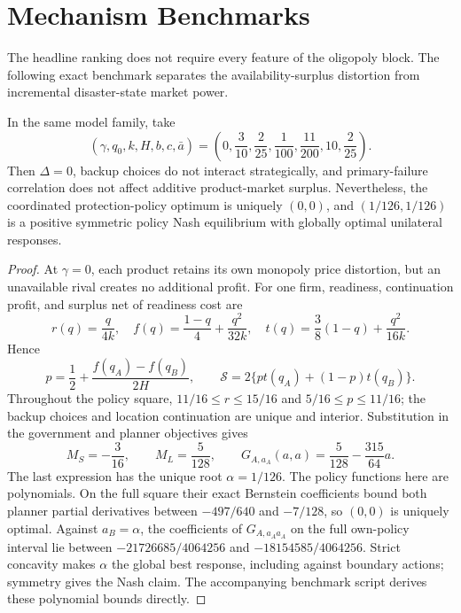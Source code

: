\section{Mechanism Benchmarks}\label{sec:benchmarks}

The headline ranking does not require every feature of the oligopoly block. The following exact benchmark separates the availability-surplus distortion from incremental disaster-state market power.

\begin{proposition}\label{prop:zero-delta}
In the same model family, take
\begin{equation}
(\gamma,q_0,k,H,b,c,\bar a)
=\left(0,\frac3{10},\frac2{25},\frac1{100},\frac{11}{200},10,\frac2{25}\right).
\label{eq:zero-delta-witness}
\end{equation}
Then $\Delta=0$, backup choices do not interact strategically, and primary-failure correlation does not affect additive product-market surplus. Nevertheless, the coordinated protection-policy optimum is uniquely $(0,0)$, and $(1/126,1/126)$ is a positive symmetric policy Nash equilibrium with globally optimal unilateral responses.
\end{proposition}

\begin{proof}
At $\gamma=0$, each product retains its own monopoly price distortion, but an unavailable rival creates no additional profit. For one firm, readiness, continuation profit, and surplus net of readiness cost are
\begin{equation}
r(q)=\frac{q}{4k},\quad
f(q)=\frac{1-q}{4}+\frac{q^2}{32k},\quad
t(q)=\frac38(1-q)+\frac{q^2}{16k}.
\end{equation}
Hence
\begin{equation}
p=\frac12+\frac{f(q_A)-f(q_B)}{2H},\qquad
\mathcal S=2\{pt(q_A)+(1-p)t(q_B)\}.
\end{equation}
Throughout the policy square, $11/16\leq r\leq15/16$ and $5/16\leq p\leq11/16$; the backup choices and location continuation are unique and interior. Substitution in the government and planner objectives gives
\begin{equation}
M_S=-\frac3{16},\qquad M_L=\frac5{128},\qquad
G_{A,a_A}(a,a)=\frac5{128}-\frac{315}{64}a.
\end{equation}
The last expression has the unique root $\alpha=1/126$. The policy functions here are polynomials. On the full square their exact Bernstein coefficients bound both planner partial derivatives between $-497/640$ and $-7/128$, so $(0,0)$ is uniquely optimal. Against $a_B=\alpha$, the coefficients of $G_{A,a_Aa_A}$ on the full own-policy interval lie between $-21726685/4064256$ and $-18154585/4064256$. Strict concavity makes $\alpha$ the global best response, including against boundary actions; symmetry gives the Nash claim. The accompanying benchmark script derives these polynomial bounds directly.
\end{proof}

